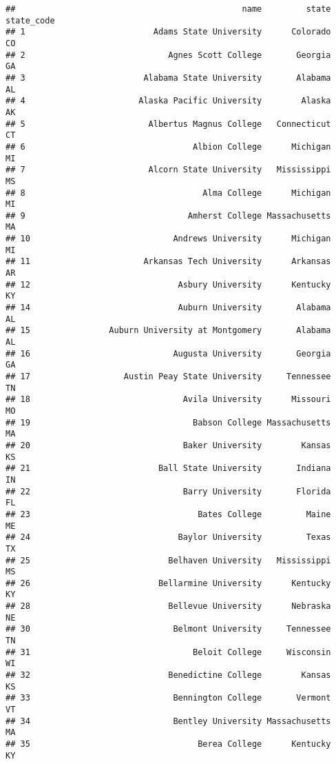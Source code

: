 \documentclass[
]{article}
\begin{document}
\begin{verbatim}
##                                              name         state state_code
## 1                          Adams State University      Colorado         CO
## 2                             Agnes Scott College       Georgia         GA
## 3                        Alabama State University       Alabama         AL
## 4                       Alaska Pacific University        Alaska         AK
## 5                         Albertus Magnus College   Connecticut         CT
## 6                                  Albion College      Michigan         MI
## 7                         Alcorn State University   Mississippi         MS
## 8                                    Alma College      Michigan         MI
## 9                                 Amherst College Massachusetts         MA
## 10                             Andrews University      Michigan         MI
## 11                       Arkansas Tech University      Arkansas         AR
## 12                              Asbury University      Kentucky         KY
## 14                              Auburn University       Alabama         AL
## 15                Auburn University at Montgomery       Alabama         AL
## 16                             Augusta University       Georgia         GA
## 17                   Austin Peay State University     Tennessee         TN
## 18                               Avila University      Missouri         MO
## 19                                 Babson College Massachusetts         MA
## 20                               Baker University        Kansas         KS
## 21                          Ball State University       Indiana         IN
## 22                               Barry University       Florida         FL
## 23                                  Bates College         Maine         ME
## 24                              Baylor University         Texas         TX
## 25                            Belhaven University   Mississippi         MS
## 26                          Bellarmine University      Kentucky         KY
## 28                            Bellevue University      Nebraska         NE
## 30                             Belmont University     Tennessee         TN
## 31                                 Beloit College     Wisconsin         WI
## 32                            Benedictine College        Kansas         KS
## 33                             Bennington College       Vermont         VT
## 34                             Bentley University Massachusetts         MA
## 35                                  Berea College      Kentucky         KY

\end{verbatim}
\end{document}
